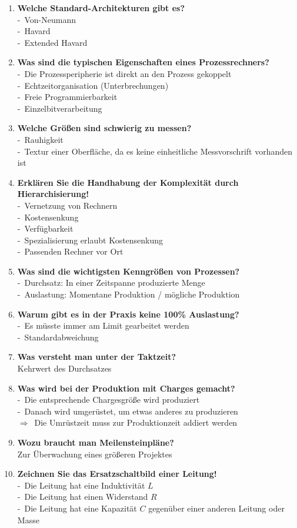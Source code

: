 \documentclass[a4paper,12pt]{article}
\newcommand{\questionnopage}[2]{\pagebreak[3]\item {\textbf{#1?}}#2}
\newcommand{\statementnopage}[2]{\pagebreak[3]\item {\textbf{#1!}}#2}
\newcommand{\catchword}[1]{\\-\ #1}
\newcommand{\normaltext}[1]{\\#1}
\newcommand{\result}[1]{\\$\Rightarrow$\ #1}
\begin{document}
\begin{enumerate}
  
  
  
  

  
  \questionnopage{Welche Standard-Architekturen gibt es}
  {
    \catchword{Von-Neumann}
    \catchword{Havard}
    \catchword{Extended Havard}
  }

  \questionnopage{Was sind die typischen Eigenschaften eines Prozessrechners}
  {
    \catchword{Die Prozessperipherie ist direkt an den Prozess gekoppelt}
    \catchword{Echtzeitorganisation (Unterbrechungen)}
    \catchword{Freie Programmierbarkeit}
    \catchword{Einzelbitverarbeitung}
  }

  \questionnopage{Welche Größen sind schwierig zu messen}
  {
    \catchword{Rauhigkeit}
    \catchword{Textur einer Oberfläche, da es keine einheitliche Messvorschrift vorhanden ist}
  }

  \statementnopage{Erklären Sie die Handhabung der Komplexität durch Hierarchisierung}
  {
    \catchword{Vernetzung von Rechnern}
    \catchword{Kostensenkung}
    \catchword{Verfügbarkeit}
    \catchword{Spezialisierung erlaubt Kostensenkung}
    \catchword{Passenden Rechner vor Ort}
  }

  \questionnopage{Was sind die wichtigsten Kenngrößen von Prozessen}
  {
    \catchword{Durchsatz: In einer Zeitspanne produzierte Menge}
    \catchword{Auslastung: Momentane Produktion / mögliche Produktion}
  }

  \questionnopage{Warum gibt es in der Praxis keine 100\% Auslastung}
  {
    \catchword{Es müsste immer am Limit gearbeitet werden}
    \catchword{Standardabweichung}
  }

  \questionnopage{Was versteht man unter der Taktzeit}
  {
    \normaltext{Kehrwert des Durchsatzes}
  }

  \questionnopage{Was wird bei der Produktion mit Charges gemacht}
  {
    \catchword{Die entsprechende Chargesgröße wird produziert}
    \catchword{Danach wird umgerüstet, um etwas anderes zu produzieren}
    \result{Die Umrüstzeit muss zur Produktionzeit addiert werden}
  }

  \questionnopage{Wozu braucht man Meilensteinpläne}
  {
    \normaltext{Zur Überwachung eines größeren Projektes}
  }

  \statementnopage{Zeichnen Sie das Ersatzschaltbild einer Leitung}
  {
    \catchword{Die Leitung hat eine Induktivität $L$}
    \catchword{Die Leitung hat einen Widerstand $R$}
    \catchword{Die Leitung hat eine Kapazität $C$ gegenüber einer anderen Leitung oder Masse}
  }


\end{enumerate}
\end{document}
